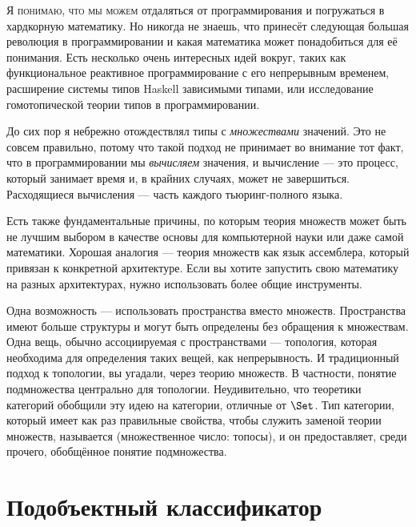
\lettrine[lhang=0.17]{Я}{ понимаю, что мы можем} отдаляться от программирования и погружаться в
хардкорную математику. Но никогда не знаешь, что принесёт следующая большая революция в
программировании и какая математика может понадобиться для её
понимания. Есть несколько очень интересных идей вокруг, таких как
функциональное реактивное программирование с его непрерывным временем, расширение
системы типов Haskell зависимыми типами, или исследование
гомотопической теории типов в программировании.

До сих пор я небрежно отождествлял типы с \emph{множествами} значений.
Это не совсем правильно, потому что такой подход не принимает во внимание
тот факт, что в программировании мы \emph{вычисляем} значения, и
вычисление — это процесс, который занимает время и, в крайних случаях, может
не завершиться. Расходящиеся вычисления — часть каждого тьюринг-полного
языка.

Есть также фундаментальные причины, по которым теория множеств может быть не лучшим
выбором в качестве основы для компьютерной науки или даже самой математики. Хорошая
аналогия — теория множеств как язык ассемблера, который привязан
к конкретной архитектуре. Если вы хотите запустить свою математику на разных
архитектурах, нужно использовать более общие инструменты.

Одна возможность — использовать пространства вместо множеств. Пространства имеют больше
структуры и могут быть определены без обращения к множествам. Одна вещь,
обычно ассоциируемая с пространствами — топология, которая необходима для определения
таких вещей, как непрерывность. И традиционный подход к топологии,
вы угадали, через теорию множеств. В частности, понятие
подмножества центрально для топологии. Неудивительно, что теоретики категорий
обобщили эту идею на категории, отличные от $\Set$. Тип
категории, который имеет как раз правильные свойства, чтобы служить заменой
теории множеств, называется  (множественное число: топосы), и он
предоставляет, среди прочего, обобщённое понятие подмножества.

\section{Подобъектный классификатор}


